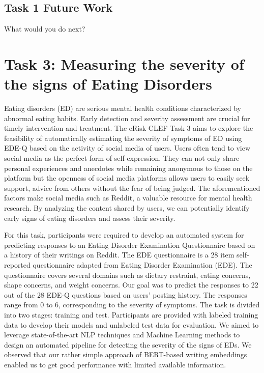 \documentclass[]{style/ceurart}
\begin{document}
\subsection{Task 1 Future Work}

What would you do next?


\section{Task 3: Measuring the severity of the signs of Eating Disorders}

Eating disorders (ED) are serious mental health conditions characterized by abnormal eating habits. Early detection and severity assessment are crucial for timely intervention and treatment. The eRisk CLEF Task 3 aims to explore the feasibility of automatically estimating the severity of symptoms of ED using EDE-Q based on the activity of social media of users. Users often tend to view social media as the perfect form of self-expression. They can not only share personal experiences and anecdotes while remaining anonymous to those on the platform but the openness of social media platforms allows users to easily seek support, advice from others without the fear of being judged. The aforementioned factors make social media such as Reddit, a valuable resource for mental health research. By analyzing the content shared by users, we can potentially identify early signs of eating disorders and assess their severity.

For this task, participants were required to develop an automated system for predicting responses to an Eating Disorder Examination Questionnaire based on a history of their writings on Reddit. The EDE questionnaire is a 28 item self-reported questionnaire adapted from Eating Disorder Examination (EDE). The questionnaire covers several domains such as dietary restraint, eating concerns, shape concerns, and weight concerns. Our goal was to predict the responses to 22 out of the 28 EDE-Q questions based on users' posting history. The responses range from 0 to 6, corresponding to the severity of symptoms. The task is divided into two stages: training and test. Participants are provided with labeled training data to develop their models and unlabeled test data for evaluation. We aimed to leverage state-of-the-art NLP techniques and Machine Learning methods to design an automated pipeline for detecting the severity of the signs of EDs. We observed that our rather simple approach of BERT-based writing embeddings enabled us to get good performance with limited available information. 
\end{document}
